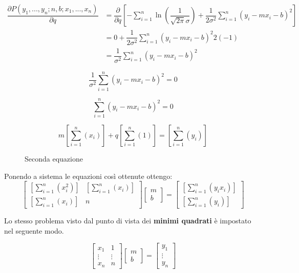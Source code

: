 \documentclass[\main/main.tex]{subfiles}
\begin{document}
\begin{align}
	\dfrac{\partial P \left(y_1,...,y_n; n, b; x_1, ..., x_n \right)}{\partial q}  &= \dfrac{\partial}{\partial q} \left [ - \sum_{i=1}^n \ln
	 \left ( \dfrac{1}{\sqrt{2\pi}\sigma} \right )
	 + \dfrac{1}{2\sigma^2} \sum_{i=1}^n
		\left(y_i - mx_i - b \right)^2
	 	 \right ]\\
	 &= 0 + \dfrac{1}{2\sigma^2} \sum_{i=1}^n \left(y_i - mx_i - b \right)^2 2 (-1)\\
	 &= \dfrac{1}{\sigma^2} \sum_{i=1}^n \left(y_i - mx_i - b \right)^2
\end{align}

\[
	\dfrac{1}{\sigma^2} \sum_{i=1}^n \left(y_i - mx_i - b \right)^2  = 0
\]

\[
	\sum_{i=1}^n \left(y_i - mx_i - b \right)^2 = 0
\]

\begin{figure}[H]
\[
	m\left [ \sum_{i=1}^n \left(x_i \right) \right ] + q \left [ \sum_{i=1}^n \left(1 \right) \right ] = \left [ \sum_{i=1}^n \left(y_i \right) \right ]
\]
\caption{Seconda equazione}
\end{figure}

Ponendo a sistema le equazioni così ottenute ottengo:
\[
\begin{bmatrix}
	\left [ \sum_{i=1}^n \left(x_i^2 \right) \right ] &  \left [ \sum_{i=1}^n \left(x_i \right) \right ] \\
	\left [ \sum_{i=1}^n \left(x_i \right) \right ] & n
\end{bmatrix}
\begin{bmatrix}
m\\
b
\end{bmatrix}
= 
\begin{bmatrix}
	\left [ \sum_{i=1}^n \left(y_i x_i \right) \right ] \\
	\left [ \sum_{i=1}^n \left(y_i \right) \right ]
\end{bmatrix}
\]

Lo stesso problema visto dal punto di vista dei \textbf{minimi quadrati} è impostato nel seguente modo.

\[
\begin{bmatrix}
	x_1 & 1\\
	\vdots & \vdots \\
	x_n & n
\end{bmatrix}
\begin{bmatrix}
	m\\
	b
\end{bmatrix}
= 
\begin{bmatrix}
	y_1\\
	\vdots\\
	y_n
\end{bmatrix}
\]
\end{document}
